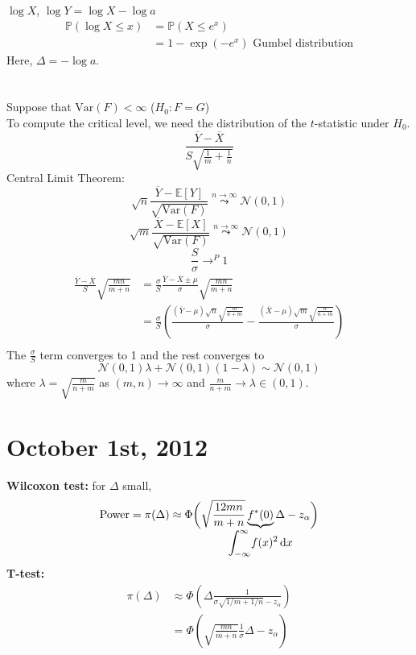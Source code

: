\documentclass[a4paper,12pt]{amsart}
\newcommand{\dx}{\,\mathrm{d}x}
\newcommand{\Var}{\mbox{Var}}
\newcommand{\E}[1]{\mathbb{E}\left[#1\right]}
\newcommand{\p}[1]{\mathbb{P}\left(#1\right)}
\begin{document}
\noindent
$\log X$, $\log Y = \log X - \log a$
\begin{align*}
\p{\log X \leq x} &= \p{X \leq e^x}\\
&= 1 - \exp(-e^x) \mbox{ Gumbel distribution}
\end{align*}
Here, $\Delta = - \log a$.\\
\\
\\
Suppose that $\Var(F) < \infty$ ($H_0: F=G$)\\
To compute the critical level, we need the distribution of the $t$-statistic under $H_0$.
\[\frac{\overline{Y} - \overline{X}}{S \sqrt{\frac{1}{m} + \frac{1}{n}}}\]
Central Limit Theorem:\\
\[\sqrt{n}\frac{\overline{Y} - \E{Y}}{\sqrt{\Var(F)}} \overset{n \to \infty}{\leadsto} \mathcal{N}(0,1)\]
\[\sqrt{m}\frac{\overline{X} - \E{X}}{\sqrt{\Var(F)}} \overset{n \to \infty}{\leadsto} \mathcal{N}(0,1)\]
\[\frac{S}{\sigma} \to^P 1\]
\begin{align*}
\frac{\overline{Y} - \overline{X}}{S} \sqrt{\frac{mn}{m+n}} &= \frac{\sigma}{S} \frac{\overline{Y} - \overline{X} \pm \mu}{\sigma} \sqrt{\frac{mn}{m+n}}\\
&= \frac{\sigma}{S} \left( \frac{(\overline{Y}- \mu)\sqrt{n} \sqrt{\frac{m}{n+m}}}{\sigma} - \frac{(\overline{X}- \mu) \sqrt{m} \sqrt{\frac{n}{n+m}}}{\sigma}\right)\\
\end{align*}
\noindent
The $\frac{\sigma}{S}$ term converges to 1 and the rest converges to 
\[\mathcal{N}(0,1)\lambda + \mathcal{N}(0,1) (1-\lambda) \sim \mathcal{N}(0,1)\]
where $\lambda = \sqrt{\frac{m}{n+m}}$ as $(m,n) \to \infty$ and $\frac{m}{n+m} \to \lambda \in (0,1)$.



\section{October 1st, 2012}
\noindent
\textbf{Wilcoxon test:} for $\Delta$ small,
\[\mbox{Power} = \pi(\Delta) \approx \Phi \bigg(\sqrt{\frac{12mn}{m+n}} \underbrace{f^*(0)}_{\mathclap{\displaystyle \int_{-\infty}^\infty \! f(x)^2 \dx}} \Delta - z_\alpha \bigg)\]
\textbf{T-test:}
\begin{align*}
\pi(\Delta) &\approx \Phi\left(\Delta \frac{1}{\sigma \sqrt{1/m + 1/n} - z_\alpha} \right) \\
&= \Phi\left(\sqrt{\frac{mn}{m+n}}\frac{1}{\sigma}\Delta - z_\alpha \right)
\end{align*}
\end{document}
